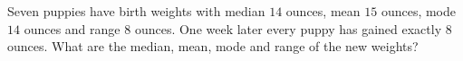 Seven puppies have birth weights with median $14$ ounces, mean $15$ ounces, mode $14$ ounces and range $8$ ounces. One week later every puppy has gained exactly $8$ ounces. What are the median, mean, mode and range of the new weights?
